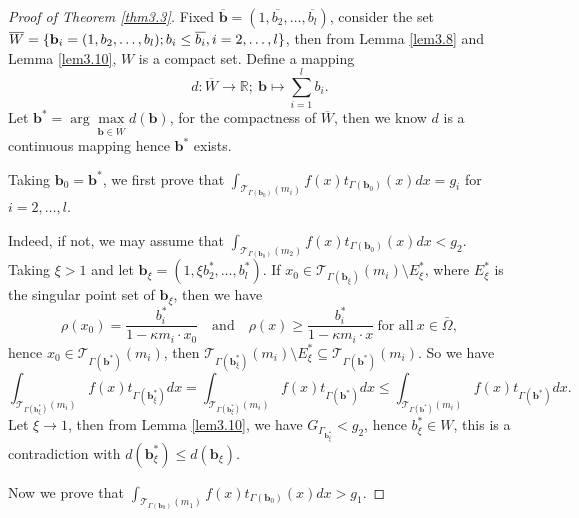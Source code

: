 \documentclass[a4paper,12pt,]{article}
\numberwithin{equation}{section}
\numberwithin{equation}{section} \allowdisplaybreaks
\begin{document}
\begin{proof}[Proof of Theorem \ref{thm3.3}]
  Fixed $\overline{\mathbf{b}} = (1,\overline{b_{2}},\ldots,\overline{b_{l}})$, consider the set $\overline{W} = \{\mathbf{b}_{i} = (1,b_{2},\ldots,b_{l});
  \newline b_{i} \leq \overline{b_{i}}, i=2,\ldots,l\}$, then from Lemma \ref{lem3.8} and Lemma \ref{lem3.10}, $W$ is a compact set. Define a mapping
  $$d:\overline{W}\rightarrow \mathbb{R};~\mathbf{b} \mapsto \sum_{i=1}^{l}b_{i}.$$
  Let $\mathbf{b}^{\ast} = \arg\max\limits_{\mathbf{b}\in \overline{W}}d(\mathbf{b})$, for the compactness of $\overline{W}$, then we know $d$ is a continuous mapping hence $\mathbf{b}^{\ast}$ exists.

  Taking $\mathbf{b}_{0} = \mathbf{b}^{\ast}$, we first prove that $\displaystyle\int_{\mathcal{T}_{\Gamma(\mathbf{b}_{0})}(m_{i})}f(x)t_{\Gamma(\mathbf{b}_{0})}(x)dx = g_{i}$ for $i = 2,\ldots,l$.

  Indeed, if not, we may assume that $\displaystyle\int_{\mathcal{T}_{\Gamma(\mathbf{b}_{0})}(m_{2})}f(x)t_{\Gamma(\mathbf{b}_{0})}(x)dx < g_{2}.$ Taking $\xi >1$ and let $\mathbf{b}_{\xi} = (1,\xi b_{2}^{\ast},\ldots, b_{l}^{\ast})$. If $x_{0} \in \mathcal{T}_{\Gamma(\mathbf{b}_{\xi})}(m_{i}) \setminus E_{\xi}^{\ast}$, where $E_{\xi}^{\ast}$ is the singular point set of $\mathbf{b}_{\xi}$, then we have
  $$\rho(x_{0}) = \frac{b_{i}^{\ast}}{1 - \kappa m_{i} \cdot x_{0}} \quad \text{and} \quad \rho(x) \geq \frac{b_{i}^{\ast}}{1 - \kappa m_{i} \cdot x}~\text{for all}~x\in \bar{\Omega},$$
  hence $x_{0} \in \mathcal{T}_{\Gamma(\mathbf{b}^{\ast})}(m_{i})$, then $\mathcal{T}_{\Gamma(\mathbf{b}_{\xi}^{\ast})}(m_{i}) \setminus E_{\xi}^{\ast} \subseteq \mathcal{T}_{\Gamma(\mathbf{b}^{\ast})}(m_{i})$. So we have
  $$\int_{\mathcal{T}_{\Gamma(\mathbf{b}_{\xi}^{\ast})}(m_{i})}f(x)t_{\Gamma(\mathbf{b}_{\xi}^{\ast})}dx = \int_{\mathcal{T}_{\Gamma(\mathbf{b}_{\xi}^{\ast})}(m_{i})}f(x)t_{\Gamma(\mathbf{b}^{\ast})}dx \leq \int_{\mathcal{T}_{\Gamma(\mathbf{b}^{\ast})}(m_{i})}f(x)t_{\Gamma(\mathbf{b}^{\ast})}dx.$$
  Let $\xi \rightarrow 1$, then from Lemma \ref{lem3.10}, we have $G_{\Gamma_{\mathbf{b}_{\xi}^{\ast}}} < g_{2}$, hence $b_{\xi}^{\ast} \in W$, this is a contradiction with $d(\mathbf{b}_{\xi}^{\ast}) \leq d(\mathbf{b}_{\xi})$.
  
  Now we prove that $\displaystyle\int_{\mathcal{T}_{\Gamma(\mathbf{b}_{0})}(m_{1})}f(x)t_{\Gamma(\mathbf{b}_{0})}(x)dx > g_{1}$.
  

\end{proof}
\end{document}
